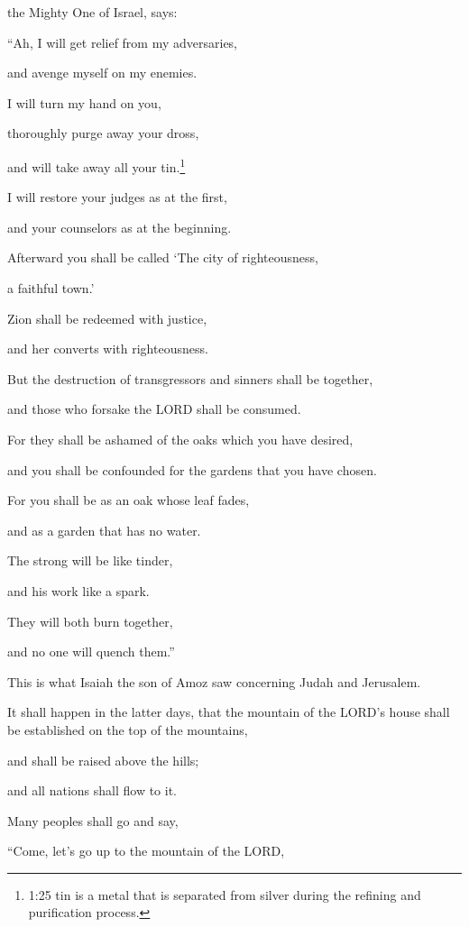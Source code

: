 the Mighty One of Israel, says:

“Ah, I will get relief from my adversaries,

and avenge myself on my enemies.

\myverse{}I will turn my hand on you,

thoroughly purge away your dross,

and will take away all your tin.\footnote{1:25 tin is a metal that is separated from silver during the refining and purification process.}

\myverse{}I will restore your judges as at the first,

and your counselors as at the beginning.

Afterward you shall be called ‘The city of righteousness,

a faithful town.’

\myverse{}Zion shall be redeemed with justice,

and her converts with righteousness.

\myverse{}But the destruction of transgressors and sinners shall be together,

and those who forsake the LORD shall be consumed.

\myverse{}For they shall be ashamed of the oaks which you have desired,

and you shall be confounded for the gardens that you have chosen.

\myverse{}For you shall be as an oak whose leaf fades,

and as a garden that has no water.

\myverse{}The strong will be like tinder,

and his work like a spark.

They will both burn together,

and no one will quench them.”


\mychapter{} \myverse*{}This is what Isaiah the son of Amoz saw concerning Judah and Jerusalem.

\myverse{}It shall happen in the latter days, that the mountain of the LORD’s
house shall be established on the top of the mountains,

and shall be raised above the hills;

and all nations shall flow to it.

\myverse{}Many peoples shall go and say,

“Come, let’s go up to the mountain of the LORD,

